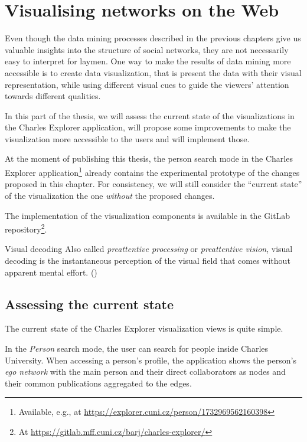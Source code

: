 \chapter{Visualising networks on the Web}

Even though the data mining processes described in the previous chapters give us valuable insights into the structure of social networks, 
they are not necessarily easy to interpret for laymen.
One way to make the results of data mining more accessible is to create data visualization, that is present the data with their visual representation, 
while using different visual cues to guide the viewers' attention towards different qualities.

In this part of the thesis, we will assess the current state of the visualizations in the Charles Explorer application, 
will propose some improvements to make the visualization more accessible to the users and will implement those.

At the moment of publishing this thesis, the person search mode in the Charles Explorer application\footnote{Available, e.g., at \url{https://explorer.cuni.cz/person/1732969562160398}} already contains the experimental prototype of the changes proposed in this chapter.
For consistency, we will still consider the ``current state'' of the visualization the one \textit{without} the proposed changes.

The implementation of the visualization components is available in the GitLab repository\footnote{At \url{https://gitlab.mff.cuni.cz/barj/charles-explorer/}}.

\begin{mybox}{Visual decoding}
    Also called \textit{preattentive processing} or \textit{preattentive vision}, visual decoding is the instantaneous perception of the visual field that comes without apparent mental effort. (\cite{Cleveland1985})
\end{mybox}

\section{Assessing the current state} \label{sec:current-state}

The current state of the Charles Explorer visualization views is quite simple. 

In the \textit{Person} search mode, the user can search for people inside Charles University. 
When accessing a person's profile, the application shows the person's \textit{ego network} with the main person and their direct collaborators 
as nodes and their common publications aggregated to the edges.

